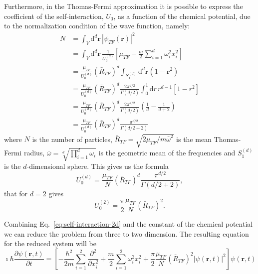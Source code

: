 Furthermore, in the Thomas-Fermi approximation it is possible to express the coefficient of the self-interaction, $U_0$, as a function of the chemical potential, due to the normalization condition of the wave function, namely:
\begin{equation}
\begin{split}
N & = \int_V \mathrm{d}^d \textbf{r} \, |\psi_{TF}(\textbf{r})|^2 \\
& = \int_V \mathrm{d}^d \textbf{r} \, \frac{1}{U_0^{(d)}} \left[ \mu_{TF} - \frac{m}{2} \sum_{i=1}^d \omega_i^2 x_i^2 \right] \\
& = \frac{\mu_{TF}}{U_0^{(d)}} \left( \bar{R}_{TF} \right)^d \int_{S_1^{(d)}} \mathrm{d}^d \textbf{r} (1 - \textbf{r}^2) \\ 
& = \frac{\mu_{TF}}{U_0^{(d)}} \left( \bar{R}_{TF} \right)^d \frac{2\pi^{d/2}}{\Gamma(d/2)} \int_0^1 \mathrm{d}r \, r^{d-1} [1 - r^2] \\
& = \frac{\mu_{TF}}{U_0^{(d)}} \left( \bar{R}_{TF} \right)^d \frac{2\pi^{d/2}}{\Gamma(d/2)} \left( \frac{1}{d} - \frac{1}{d+2} \right) \\
& = \frac{\mu_{TF}}{U_0^{(d)}} \left( \bar{R}_{TF} \right)^d \frac{\pi^{d/2}}{\Gamma(d/2 + 2)}
\end{split}
\end{equation}
where $N$ is the number of particles, $\bar{R}_{TF} = \sqrt{2\mu_{TF} / m \bar{\omega}^2}$ is the mean Thomas-Fermi radius, $\bar{\omega} = \sqrt[d]{\prod_{i=1}^d \omega_i}$ is the geometric mean of the frequencies and $S_1^{(d)}$ is the $d$-dimensional sphere.
This gives us the formula
\begin{equation}
U_0^{(d)} = \frac{\mu_{TF}}{N} \left( \bar{R}_{TF} \right)^d \frac{\pi^{d/2}}{\Gamma(d/2 + 2)},
\end{equation}
that for $d=2$ gives
\begin{equation} \label{eq:self-interaction-2d}
U_0^{(2)} = \frac{\pi}{2} \frac{\mu_{TF}}{N} \left( \bar{R}_{TF} \right)^2.
\end{equation}

Combining Eq.~\eqref{eq:self-interaction-2d} and the constant of the chemical potential we can reduce the problem from three to two dimension. The resulting equation for the reduced system will be
\begin{equation}
\imath \hbar \frac{\partial \psi(\textbf{r}, t)}{\partial t} = \left[ - \frac{\hbar^2}{2m} \sum_{i=1}^2 \frac{\partial^2}{\partial x_i^2} + \frac{m}{2} \sum_{i=1}^2 \omega_i^2 x_i^2 + \frac{\pi}{2} \frac{\mu_{TF}}{N} \left( \bar{R}_{TF} \right)^2 |\psi(\textbf{r}, t)|^2 \right] \psi(\textbf{r}, t) \nonumber
\end{equation}